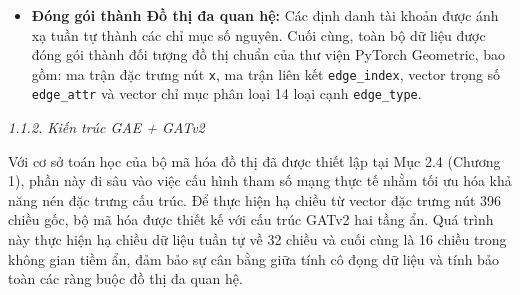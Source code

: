 \begin{itemize}[label={--}, itemsep=3pt]
    Mặc dù được phân nhóm dưới góc độ 04 tầng ngữ nghĩa để xây dựng cơ sở lý luận, hệ thống thực tế vẫn bảo toàn nguyên vẹn sự đa dạng của 14 loại quan hệ thông qua chỉ mục phân loại cạnh. Việc giữ độc lập các loại cạnh thay vì gộp chung giúp mạng nơ-ron đồ thị khai thác được đặc trưng vi mô của từng hành vi đơn lẻ. Quá trình xử lý cạnh được tiếp tục qua các bước kỹ thuật:

    \begin{itemize}[label={+}, itemsep=1pt]
        \item \textit{Sinh cạnh ngược:} Đối với các loại quan hệ có hướng (nhóm Theo dõi và Tương tác), hệ thống sinh thêm các chiều cạnh ngược tương ứng (ví dụ: \texttt{FOLLOW\_REV}) để đảm bảo thông điệp lan truyền linh hoạt theo cả hai chiều. Riêng các cạnh \texttt{SIMILARITY} và \texttt{CO-OWNER} vốn mang tính đối xứng nên được giữ nguyên cấu trúc vô hướng.
        \item \textit{Gán trọng số cạnh:} Với mỗi loại cạnh cụ thể giữa hai thực thể, hệ thống gán trọng số cơ sở ($W_{base}$) và áp dụng hàm chuẩn hóa Logarit trên tần suất xuất hiện của hành vi đó. Cơ chế này giúp kiểm soát cường độ tương tác, hạn chế nhiễu.
    \end{itemize}
    
    \item \textbf{Đóng gói thành Đồ thị đa quan hệ:} Các định danh tài khoản được ánh xạ tuần tự thành các chỉ mục số nguyên. Cuối cùng, toàn bộ dữ liệu được đóng gói thành đối tượng đồ thị chuẩn của thư viện PyTorch Geometric, bao gồm: ma trận đặc trưng nút \texttt{x}, ma trận liên kết \texttt{edge\_index}, vector trọng số \texttt{edge\_attr} và vector chỉ mục phân loại 14 loại cạnh \texttt{edge\_type}.
\end{itemize}


\textit{1.1.2. Kiến trúc GAE + GATv2}\vspace{0.2cm}

Với cơ sở toán học của bộ mã hóa đồ thị đã được thiết lập tại Mục 2.4 (Chương 1), phần này đi sâu vào việc cấu hình tham số mạng thực tế nhằm tối ưu hóa khả năng nén đặc trưng cấu trúc. Để thực hiện hạ chiều từ vector đặc trưng nút 396 chiều gốc, bộ mã hóa được thiết kế với cấu trúc GATv2 hai tầng ẩn. Quá trình này thực hiện hạ chiều dữ liệu tuần tự về 32 chiều và cuối cùng là 16 chiều trong không gian tiềm ẩn, đảm bảo sự cân bằng giữa tính cô đọng dữ liệu và tính bảo toàn các ràng buộc đồ thị đa quan hệ.\vspace{0.3cm}

